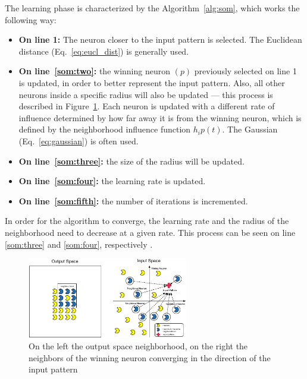 \documentclass[journal]{IEEEtran}
\begin{document}
The learning phase is characterized by the Algorithm~\ref{alg:som}, which works the following way:
\begin{itemize}
  \item \textbf{On line 1:} The neuron closer to the input pattern is selected. The Euclidean distance (Eq.~\ref{eq:eucl_dist}) is generally used.
    
  \item \textbf{On line~\ref{som:two}:} the winning neuron $(p)$ previously selected on line 1 is updated, in order to better represent the input pattern. Also, all other neurons inside a specific radius will also be updated --- this process is described in Figure~\ref{fig:5_neighbours_converge}. Each neuron is updated with a different rate of influence determined by how far away it is from the winning neuron, which is defined by the neighborhood influence function $h_ip(t)$. The Gaussian (Eq.~\ref{eq:gaussian}) is often used. 
    
  \item \textbf{On line~\ref{som:three}:} the size of the radius will be updated.
  \item \textbf{On line~\ref{som:four}:} the learning rate is updated.
  \item \textbf{On line~\ref{som:fifth}:} the number of iterations is incremented.
\end{itemize}
 
In order for the algorithm to converge, the learning rate and the radius of the neighborhood need to decrease at a given rate. This process can be seen on line \ref{som:three} and \ref{som:four}, respectively .

\begin{figure}
  \begin{center}
    \includegraphics[width=7cm]{images/5_neighbours_converge.eps}
  \end{center}
  \caption{ On the left the output space neighborhood, on the right the neighbors of the winning neuron converging in the direction of the input pattern }
  \label{fig:5_neighbours_converge}
\end{figure}
\end{document}
